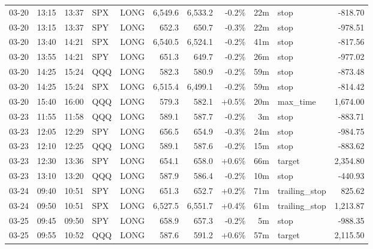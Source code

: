 \documentclass[11pt,a4paper,twoside]{article}
\begin{document}
\begin{center}
\begin{longtable}{>{\color{txtmain}}l l l l l r r r r >{\color{txtmain}}l r}
03-20 & 13:15 & 13:37 & SPX & LONG & 6,549.6 & 6,533.2 & \textcolor{lossred}{-0.2\%} & 22m & stop & \textcolor{lossred}{-818.70} \\
03-20 & 13:15 & 13:37 & SPY & LONG & 652.3 & 650.7 & \textcolor{lossred}{-0.3\%} & 22m & stop & \textcolor{lossred}{-978.51} \\
03-20 & 13:40 & 14:21 & SPX & LONG & 6,540.5 & 6,524.1 & \textcolor{lossred}{-0.2\%} & 41m & stop & \textcolor{lossred}{-817.56} \\
03-20 & 13:55 & 14:21 & SPY & LONG & 651.3 & 649.7 & \textcolor{lossred}{-0.2\%} & 26m & stop & \textcolor{lossred}{-977.02} \\
03-20 & 14:25 & 15:24 & QQQ & LONG & 582.3 & 580.9 & \textcolor{lossred}{-0.2\%} & 59m & stop & \textcolor{lossred}{-873.48} \\
03-20 & 14:25 & 15:24 & SPX & LONG & 6,515.4 & 6,499.1 & \textcolor{lossred}{-0.2\%} & 59m & stop & \textcolor{lossred}{-814.42} \\
03-20 & 15:40 & 16:00 & QQQ & LONG & 579.3 & 582.1 & \textcolor{wingreen}{+0.5\%} & 20m & max\_time & \textcolor{wingreen}{1,674.00} \\
03-23 & 11:55 & 11:58 & QQQ & LONG & 589.1 & 587.7 & \textcolor{lossred}{-0.2\%} & 3m & stop & \textcolor{lossred}{-883.71} \\
03-23 & 12:05 & 12:29 & SPY & LONG & 656.5 & 654.9 & \textcolor{lossred}{-0.3\%} & 24m & stop & \textcolor{lossred}{-984.75} \\
03-23 & 12:10 & 12:25 & QQQ & LONG & 589.1 & 587.6 & \textcolor{lossred}{-0.2\%} & 15m & stop & \textcolor{lossred}{-883.62} \\
03-23 & 12:30 & 13:36 & SPY & LONG & 654.1 & 658.0 & \textcolor{wingreen}{+0.6\%} & 66m & target & \textcolor{wingreen}{2,354.80} \\
03-23 & 13:10 & 13:20 & QQQ & LONG & 587.9 & 586.4 & \textcolor{lossred}{-0.2\%} & 10m & stop & \textcolor{lossred}{-440.93} \\
03-24 & 09:40 & 10:51 & SPY & LONG & 651.3 & 652.7 & \textcolor{wingreen}{+0.2\%} & 71m & trailing\_stop & \textcolor{wingreen}{825.62} \\
03-24 & 09:50 & 10:51 & SPX & LONG & 6,527.5 & 6,551.7 & \textcolor{wingreen}{+0.4\%} & 61m & trailing\_stop & \textcolor{wingreen}{1,213.87} \\
03-25 & 09:45 & 09:50 & SPY & LONG & 658.9 & 657.3 & \textcolor{lossred}{-0.2\%} & 5m & stop & \textcolor{lossred}{-988.35} \\
03-25 & 09:55 & 10:52 & QQQ & LONG & 587.6 & 591.2 & \textcolor{wingreen}{+0.6\%} & 57m & target & \textcolor{wingreen}{2,115.50} \\

\end{longtable}
\end{center}
\end{document}
